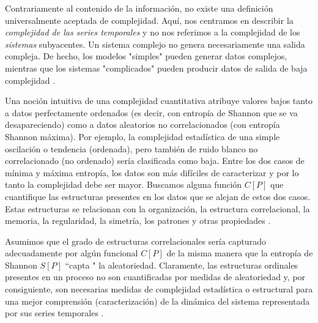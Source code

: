 Contrariamente al contenido de la información, no existe una definición universalmente aceptada de complejidad.
Aquí, nos centramos en describir la \textit{complejidad de las series temporales} y no nos referimos a la complejidad de los \textit{sistemas} subyacentes.
Un sistema complejo no genera necesariamente una salida compleja.
De hecho, los modelos "simples" pueden generar datos complejos, mientras que los sistemas "complicados" pueden producir datos de salida de baja complejidad \cite{Kantz1998}.

Una noción intuitiva de una complejidad cuantitativa atribuye valores bajos tanto a datos perfectamente ordenados (es decir, con entropía de Shannon que se va desapareciendo) como a datos aleatorios no correlacionados (con entropía Shannon máxima).
Por ejemplo, la complejidad estadística de una simple oscilación o tendencia (ordenada), pero también de ruido blanco no correlacionado (no ordenado) sería clasificada como baja.
Entre los dos casos de mínima y máxima entropía, los datos son más difíciles de caracterizar y por lo tanto la complejidad debe ser mayor.
Buscamos alguna función $C[P]$ que cuantifique las estructuras presentes en los datos que se alejan de estos dos casos.
Estas estructuras se relacionan con la organización, la estructura correlacional, la memoria, la regularidad, la simetría, los patrones y otras propiedades \cite{Feldman2008}.

Asumimos que el grado de estructuras correlacionales sería capturado adecuadamente por algún funcional $C[P]$ de la misma manera que la entropía de Shannon $S[P]$ \cite{Shannon1948} ``capta " la aleatoriedad.
Claramente, las estructuras ordinales presentes en un proceso no son cuantificadas por medidas de aleatoriedad y, por consiguiente, son necesarias medidas de complejidad estadística o estructural para una mejor comprensión (caracterización) de la dinámica del sistema representada por sus series temporales \cite{Feldman1998}.

